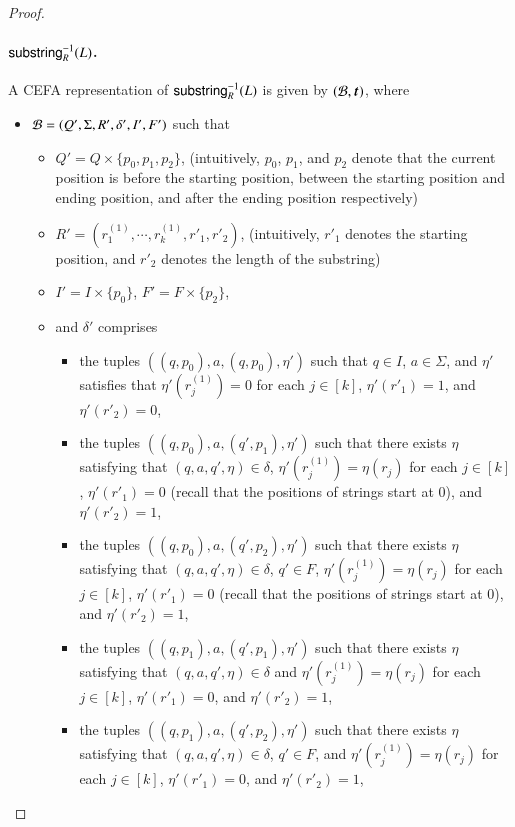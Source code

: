 \begin{proof}

\paragraph*{$\mathsf{substring}^{-1}_R(L)$.}
A CEFA representation of $\mathsf{substring}^{-1}_R(L)$ is given by $(\cB, \vec{t})$, where 
\begin{itemize}
\item $\mathcal{B} = (Q', \Sigma, R', \delta', I', F')$ such that 
\begin{itemize}
\item $Q' = Q \times \{p_0, p_1, p_2\}$, (intuitively, $p_0$, $p_1$, and $p_2$ denote that the current position is before the starting position, between the starting position and ending position, and after the ending position respectively)
%
\item $R' = \left(r^{(1)}_1,\cdots, r^{(1)}_k, r'_1, r'_2 \right)$, (intuitively, $r'_1$ denotes the starting position, and $r'_2$ denotes the length of the substring)
%
\item $I'=I \times \{p_0\}$, $F'=F \times \{p_2\}$,
%
\item and $\delta'$ comprises 
\begin{itemize}
\item the tuples $((q, p_0), a, (q, p_0), \eta')$ such that $q \in I$, $a \in \Sigma$, and $\eta'$ satisfies that $\eta'(r^{(1)}_j)=0$ for each $j \in [k]$, $\eta'(r'_1)= 1$, and $\eta'(r'_2) = 0$,
%
\item the tuples $((q, p_0), a, (q', p_1), \eta')$ such that there exists $\eta$ satisfying that $(q, a, q', \eta) \in \delta$, $\eta'(r^{(1)}_j)=\eta(r_j)$ for each $j \in [k]$,  $\eta'(r'_1)=0$ (recall that the positions of strings start at $0$), and $\eta'(r'_2) = 1$,
%
\item the tuples $((q, p_0), a, (q', p_2), \eta')$ such that there exists $\eta$ satisfying that $(q, a, q', \eta) \in \delta$, $q' \in F$, $\eta'(r^{(1)}_j)=\eta(r_j)$ for each $j \in [k]$,  $\eta'(r'_1)=0$ (recall that the positions of strings start at $0$), and $\eta'(r'_2) = 1$,
%
\item the tuples $((q, p_1), a, (q', p_1), \eta')$ such that there exists $\eta$ satisfying that $(q, a, q', \eta) \in \delta$ and $\eta'(r^{(1)}_j)=\eta(r_j)$ for each $j \in [k]$, $\eta'(r'_1) = 0$, and $\eta'(r'_2) = 1$,
%
\item the tuples $((q, p_1), a, (q', p_2), \eta')$ such that there exists $\eta$ satisfying that $(q, a, q', \eta) \in \delta$, $q' \in F$, and $\eta'(r^{(1)}_j)=\eta(r_j)$ for each $j \in [k]$, $\eta'(r'_1) = 0$, and $\eta'(r'_2) = 1$,

\end{itemize}
\end{itemize}
\end{itemize}
\end{proof}

